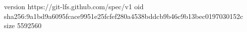 version https://git-lfs.github.com/spec/v1
oid sha256:9a1bd9a6095fcace9951e25fcfef280a4538bddcb9b46c9b13bec0197030152c
size 5592560
